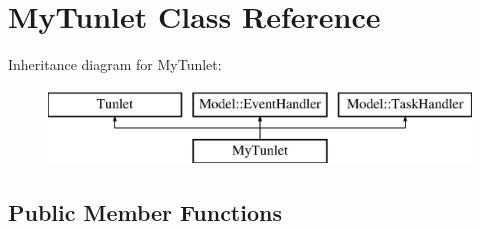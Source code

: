 \hypertarget{class_my_tunlet}{\section{My\-Tunlet Class Reference}
\label{class_my_tunlet}
}
Inheritance diagram for My\-Tunlet\-:\begin{figure}[H]
\begin{center}
\leavevmode
\includegraphics[height=2.000000cm]{class_my_tunlet}
\end{center}
\end{figure}
\subsection*{Public Member Functions}
